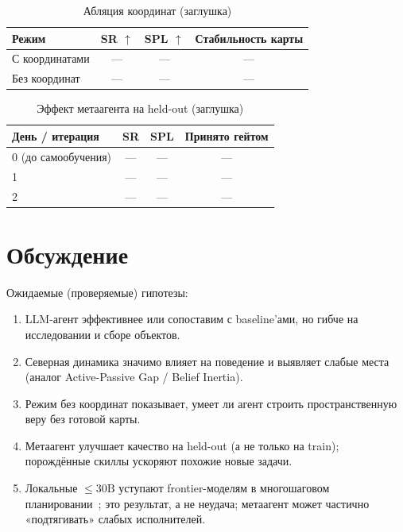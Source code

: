 \documentclass[11pt,a4paper]{article}
\begin{document}
\begin{table}[ht]
\centering
\caption{Абляция координат (заглушка)}
\label{tab:ablation}
\begin{tabular}{lccc}
\toprule
Режим & SR \(\uparrow\) & SPL \(\uparrow\) & Стабильность карты \\
\midrule
С координатами & --- & --- & --- \\
Без координат & --- & --- & --- \\
\bottomrule
\end{tabular}
\end{table}

\begin{table}[ht]
\centering
\caption{Эффект метаагента на held-out (заглушка)}
\label{tab:meta}
\begin{tabular}{lccc}
\toprule
День / итерация & SR & SPL & Принято гейтом \\
\midrule
0 (до самообучения) & --- & --- & --- \\
1 & --- & --- & --- \\
2 & --- & --- & --- \\
\bottomrule
\end{tabular}
\end{table}

\section{Обсуждение}
\label{sec:discussion}

Ожидаемые (проверяемые) гипотезы:
\begin{enumerate}[leftmargin=*]
  \item LLM-агент эффективнее или сопоставим с baseline'ами, но гибче
        на исследовании и сборе объектов.
  \item Северная динамика значимо влияет на поведение и выявляет слабые места
        (аналог Active-Passive Gap / Belief Inertia).
  \item Режим без координат показывает, умеет ли агент строить пространственную
        веру без готовой карты.
  \item Метаагент улучшает качество на held-out (а не только на train);
        порождённые скиллы ускоряют похожие новые задачи.
  \item Локальные \(\le 30\mathrm{B}\) уступают frontier-моделям в многошаговом
        планировании~\cite{liu2023agentbench}; это результат, а не неудача;
        метаагент может частично «подтягивать» слабых исполнителей.
\end{enumerate}
\end{document}
